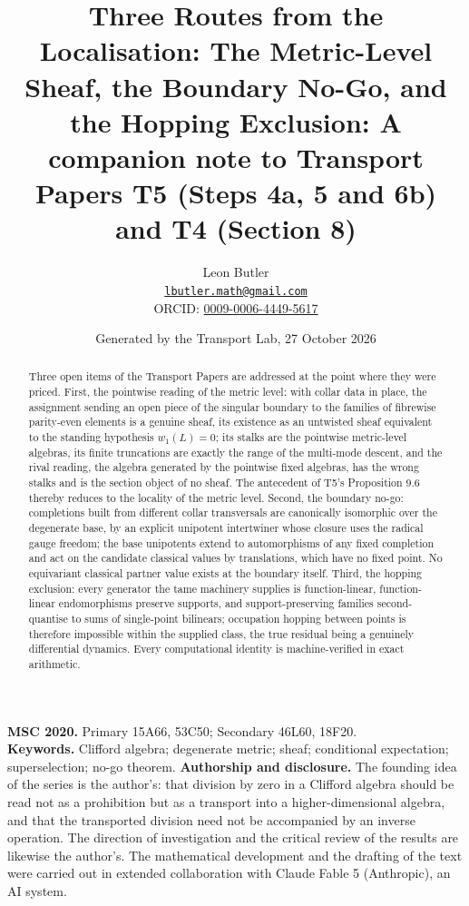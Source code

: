 \documentclass[11pt]{article}
\title{\bfseries Three Routes from the Localisation: The Metric-Level Sheaf, the Boundary No-Go, and the Hopping Exclusion: A companion note to Transport Papers T5 (Steps 4a, 5 and 6b) and T4 (Section 8)}
\author{Leon Butler\\ \normalsize\href{mailto:lbutler.math@gmail.com}{\texttt{lbutler.math@gmail.com}}\\ \normalsize ORCID: \href{https://orcid.org/0009-0006-4449-5617}{0009-0006-4449-5617}}
\date{Generated by the Transport Lab, 27 October 2026}
\theoremstyle{definition}
\theoremstyle{plain}
\providecommand{\shL}{}\renewcommand{\shL}{L}
\begin{document}
\maketitle
\begin{abstract}
\normalsize
Three open items of the Transport Papers are addressed at the point where they were priced. First, the pointwise reading of the metric level: with collar data in place, the assignment sending an open piece of the singular boundary to the families of fibrewise parity-even elements is a genuine sheaf, its existence as an untwisted sheaf equivalent to the standing hypothesis $w_1(\shL) = 0$; its stalks are the pointwise metric-level algebras, its finite truncations are exactly the range of the multi-mode descent, and the rival reading, the algebra generated by the pointwise fixed algebras, has the wrong stalks and is the section object of no sheaf. The antecedent of T5's Proposition 9.6 thereby reduces to the locality of the metric level. Second, the boundary no-go: completions built from different collar transversals are canonically isomorphic over the degenerate base, by an explicit unipotent intertwiner whose closure uses the radical gauge freedom; the base unipotents extend to automorphisms of any fixed completion and act on the candidate classical values by translations, which have no fixed point. No equivariant classical partner value exists at the boundary itself. Third, the hopping exclusion: every generator the tame machinery supplies is function-linear, function-linear endomorphisms preserve supports, and support-preserving families second-quantise to sums of single-point bilinears; occupation hopping between points is therefore impossible within the supplied class, the true residual being a genuinely differential dynamics. Every computational identity is machine-verified in exact arithmetic.
\end{abstract}
\medskip
\noindent\textbf{MSC 2020.} Primary 15A66, 53C50; Secondary 46L60, 18F20.\\
\textbf{Keywords.} Clifford algebra; degenerate metric; sheaf; conditional expectation; superselection; no-go theorem.
\newpage
\noindent \textbf{Authorship and disclosure. }The founding idea of the series is the author's: that division by zero in a Clifford algebra should be read not as a prohibition but as a transport into a higher-dimensional algebra, and that the transported division need not be accompanied by an inverse operation. The direction of investigation and the critical review of the results are likewise the author's. The mathematical development and the drafting of the text were carried out in extended collaboration with Claude Fable 5 (Anthropic), an AI system.
\end{document}
